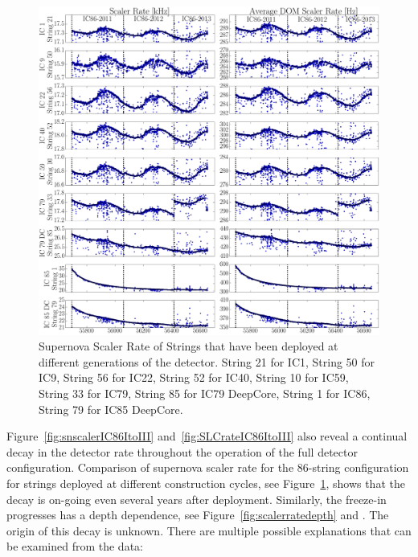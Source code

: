 \begin{figure}[h]
  \begin{center}
    \includegraphics[width=1\textwidth]{./figures/SNScalerRateAgeIC86I_III.png}
  \end{center}
  \caption{Supernova Scaler Rate of Strings that have been deployed at different generations of the detector. String 21 for IC1, String 50 for IC9, String 56 for IC22, String 52 for IC40, String 10 for IC59, String 33 for IC79, String 85 for IC79 DeepCore, String 1 for IC86, String 79 for IC85 DeepCore. \label{fig:scalerrateage}}   
\end{figure}

Figure~\ref{fig:snscalerIC86ItoIII} and~\ref{fig:SLCrateIC86ItoIII} also reveal a continual decay in the detector rate throughout the operation of the full detector configuration. Comparison of supernova scaler rate for the 86-string configuration for strings deployed at different construction cycles, see Figure~\ref{fig:scalerrateage}, shows that the decay is on-going even several years after deployment. Similarly, the freeze-in progresses has a depth dependence, see Figure~\ref{fig:scalerratedepth} and \cite{mkrasbergtalk}. The origin of this decay is unknown. There are multiple possible explanations that can be examined from the data:

